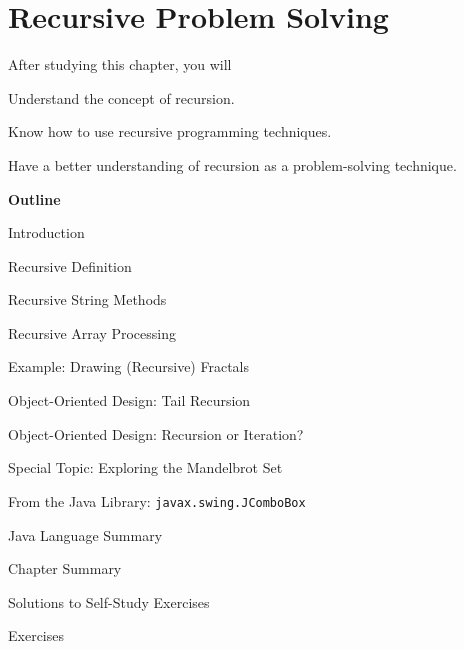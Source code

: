 \setcounter{SSTUDYcount}{1}
\setcounter{chapter}{11}
\chapter{Recursive Problem Solving}
\label{chapter-recursion}



\CObegin
{}
\label{objectives}

\noindent After studying this chapter, you will

\begin{COBL}
\item  Understand the concept of recursion.
\item  Know how to use recursive programming techniques.
\item  Have a better understanding of recursion as a
problem-solving technique.
\end{COBL}

\label{outline}
{\bf \large Outline}

\begin{COL}
\item {Introduction}
\item {Recursive Definition}
\item {Recursive String Methods}
\item {Recursive Array Processing}
\item {Example: Drawing (Recursive) Fractals}
\item {Object-Oriented Design: Tail Recursion}
\item {Object-Oriented Design: Recursion or Iteration?}
\item[] {{\color{cyan}Special Topic:} Exploring the Mandelbrot Set}
\item {From the Java Library: {\tt javax.swing.JComboBox}}
\item[] {Java Language Summary}
\par\small\item[] {Chapter Summary}
\par\small\item[] {Solutions to Self-Study Exercises}
\par\small\item[] {Exercises}
\end{COL}
\COend


